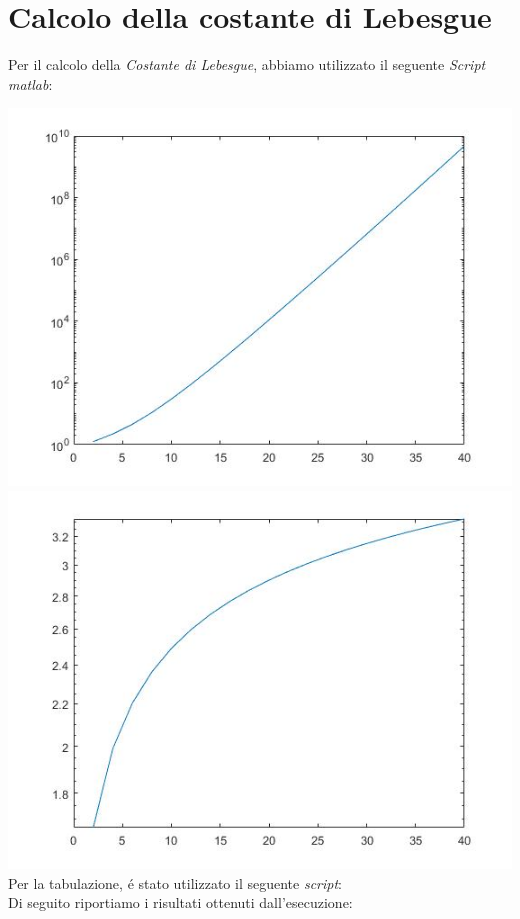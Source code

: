 \section*{Calcolo della costante di Lebesgue}
Per il calcolo della \emph{Costante di Lebesgue}, abbiamo utilizzato il seguente \emph{Script matlab}: 

\includegraphics[width=1\linewidth]{img/19equidistanti.jpg}
\includegraphics[width=1\linewidth]{img/19cheb.jpg}
\newpage
Per la tabulazione, \'e stato utilizzato il seguente \emph{script}:\\

Di seguito riportiamo i risultati ottenuti dall'esecuzione:\\ \\
